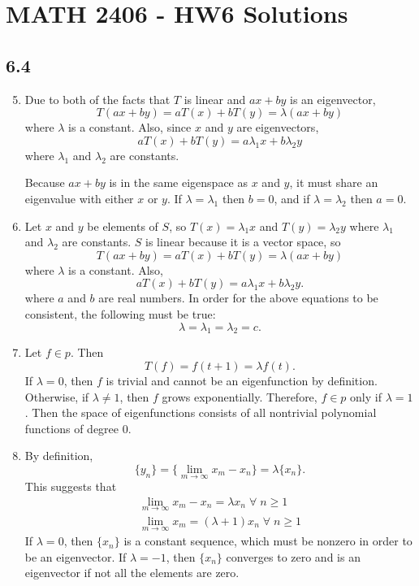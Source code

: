 \documentclass[a4paper, 12pt]{article}
\begin{document}
	\section*{MATH 2406 - HW6 Solutions}
	
	\subsection*{6.4}
	\begin{enumerate}
		\setcounter{enumi}{4}
		\item Due to both of the facts that $T$ is linear and $ax + by$ is an eigenvector,
		\[ T(ax + by) = aT(x) + bT(y) = \lambda(ax + by) \]
		where $\lambda$ is a constant. Also, since $x$ and $y$ are eigenvectors,
		\[ aT(x) + bT(y) = a\lambda_1x + b\lambda_2y \]
		where $\lambda_1$ and $\lambda_2$ are constants. \par
		Because $ax + by$ is in the same eigenspace as $x$ and $y$, it must share an eigenvalue with either $x$ or $y$. If $\lambda = \lambda_1$ then $b = 0$, and if $\lambda = \lambda_2$ then $a = 0$.
		
		\item Let $x$ and $y$ be elements of $S$, so $T(x) = \lambda_1x$ and $T(y) = \lambda_2y$ where $\lambda_1$ and $\lambda_2$ are constants. $S$ is linear because it is a vector space, so
		\[ T(ax + by) = aT(x) + bT(y) = \lambda(ax + by) \]
		where $\lambda$ is a constant. Also,
		\[ aT(x) + bT(y) = a\lambda_1x + b\lambda_2y. \]
		where $a$ and $b$ are real numbers. In order for the above equations to be consistent, the following must be true:
		\[ \lambda = \lambda_1 = \lambda_2 = c. \]
		
		\item Let $f \in p$. Then
		\[ T(f) = f(t + 1) = \lambda f(t). \]
		If $\lambda = 0$, then $f$ is trivial and cannot be an eigenfunction by definition. Otherwise, if $\lambda \neq 1$, then $f$ grows exponentially. Therefore, $f \in p$ only if $\lambda = 1$. Then the space of eigenfunctions consists of all nontrivial polynomial functions of degree $0$.
		
		\setcounter{enumi}{10}
		\item By definition,
		\[ \{y_n\} = \{\lim_{m \to \infty}x_m - x_n\} = \lambda\{x_n\}. \]
		This suggests that
		\begin{gather*}
		\lim_{m \to \infty}x_m - x_n = \lambda x_n \; \forall \; n \geq 1 \\ 
		\lim_{m \to \infty}x_m = (\lambda + 1)x_n \; \forall \; n \geq 1
		\end{gather*}
		If $\lambda = 0$, then $\{x_n\}$ is a constant sequence, which must be nonzero in order to be an eigenvector. If $\lambda = -1$, then $\{x_n\}$ converges to zero and is an eigenvector if not all the elements are zero.
	\end{enumerate}
	
\end{document}
